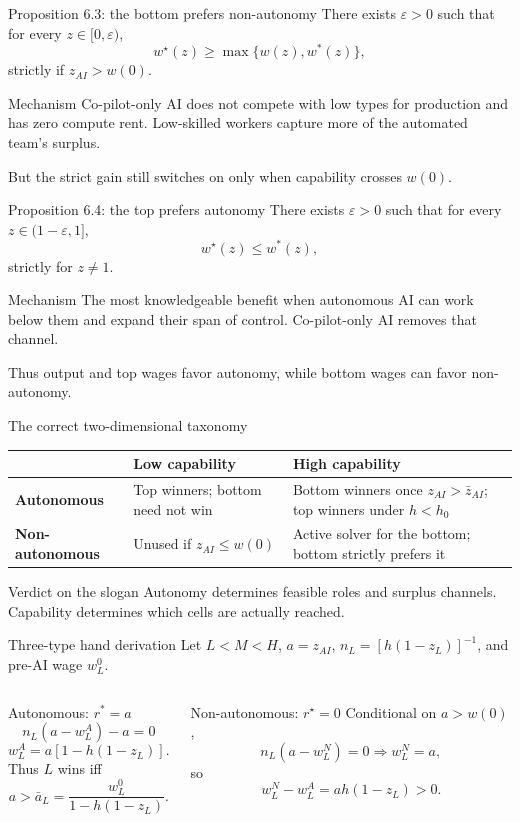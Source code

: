 \documentclass[aspectratio=169,10pt]{beamer}
\newcommand{\wpre}{w}
\newcommand{\waut}{w^*}
\newcommand{\wnon}{w^\star}
\begin{document}
\begin{frame}{Proposition 6.3: the bottom prefers non-autonomy}
\small
There exists $\varepsilon>0$ such that for every $z\in[0,\varepsilon)$,
\[
\boxed{\wnon(z)\ge\max\{\wpre(z),\waut(z)\}},
\]
strictly if $z_{AI}>w(0)$.
\begin{block}{Mechanism}
Co-pilot-only AI does not compete with low types for production and has zero compute rent. Low-skilled workers capture more of the automated team's surplus.
\end{block}
But the strict gain still switches on only when capability crosses $w(0)$.
\end{frame}

\begin{frame}{Proposition 6.4: the top prefers autonomy}
\small
There exists $\varepsilon>0$ such that for every $z\in(1-\varepsilon,1]$,
\[
\boxed{\wnon(z)\le\waut(z)},
\]
strictly for $z\ne1$.
\begin{block}{Mechanism}
The most knowledgeable benefit when autonomous AI can work below them and expand their span of control. Co-pilot-only AI removes that channel.
\end{block}
Thus output and top wages favor autonomy, while bottom wages can favor non-autonomy.
\end{frame}

\begin{frame}{The correct two-dimensional taxonomy}
\small
\centering
\begin{tabularx}{.96\textwidth}{>{\bfseries}lXX}
\toprule
& Low capability & High capability \\
\midrule
Autonomous & Top winners; bottom need not win & Bottom winners once $z_{AI}>\bar z_{AI}$; top winners under $h<h_0$ \\
\addlinespace
Non-autonomous & Unused if $z_{AI}\le w(0)$ & Active solver for the bottom; bottom strictly prefers it \\
\bottomrule
\end{tabularx}
\vspace{.4cm}
\begin{alertblock}{Verdict on the slogan}
Autonomy determines feasible roles and surplus channels. Capability determines which cells are actually reached.
\end{alertblock}
\end{frame}

\begin{frame}{Three-type hand derivation}
\small
Let $L<M<H$, $a=z_{AI}$, $n_L=[h(1-z_L)]^{-1}$, and pre-AI wage $w_L^0$.
\begin{columns}[T,onlytextwidth]
\begin{block}{Autonomous: $r^*=a$}
\[
n_L(a-w_L^A)-a=0
\]
\[
w_L^A=a[1-h(1-z_L)].
\]
Thus $L$ wins iff
\[
a>\bar a_L=\frac{w_L^0}{1-h(1-z_L)}.
\]
\end{block}
\begin{alertblock}{Non-autonomous: $r^\star=0$}
Conditional on $a>w(0)$,
\[
n_L(a-w_L^N)=0\Rightarrow w_L^N=a,
\]
so
\[
w_L^N-w_L^A=ah(1-z_L)>0.
\]
\end{alertblock}
\end{columns}
\end{frame}
\end{document}
